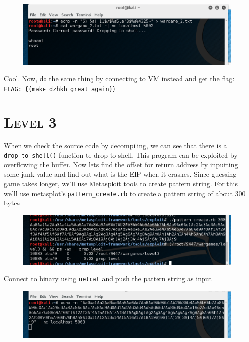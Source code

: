 \documentclass[12pt, bibliography=totocnumbered]{article}
\newcommand{\ssection}[1]{%
  \section[#1]{\centering\normalfont\scshape #1}}
\begin{document}
\begin{figure}[H]
\centerline{\includegraphics[width=1\textwidth]{img/2/4.png}}
\end{figure}

Cool. Now, do the same thing by connecting to VM instead and get the flag:
\newline
\texttt{FLAG: \{\{make dzhkh great again\}\}}

\newpage
\ssection{\textbf{Level 3}}

When we check the source code by decompiling, we can see that there is a \texttt{drop\_to\_shell()} function to drop to shell. This program can be exploited by overflowing the buffer. Now lets find the offset for return address by inputting some junk value and find out what is the EIP when it crashes. Since guessing game takes longer, we'll use Metasploit tools to create pattern string. For this we'll use metasplot's \texttt{pattern\_create.rb} to create a pattern string of about 300 bytes.

\begin{figure}[H]
\centerline{\includegraphics[width=1\textwidth]{img/3/1.png}}
\end{figure}

Connect to binary using \texttt{netcat} and push the pattern string as input

\begin{figure}[H]
\centerline{\includegraphics[width=1\textwidth]{img/3/2.png}}
\end{figure}
\end{document}
